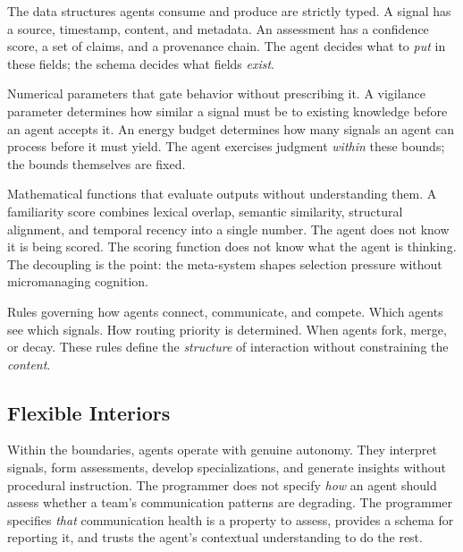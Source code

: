 \documentclass[11pt,twocolumn]{article}
\begin{document}
\begin{description}[nosep,leftmargin=1em]
  \item[Schemas.] The data structures agents consume and produce are
    strictly typed.  A signal has a source, timestamp, content, and
    metadata.  An assessment has a confidence score, a set of claims, and
    a provenance chain.  The agent decides what to \emph{put} in these
    fields; the schema decides what fields \emph{exist}.
  \item[Thresholds.] Numerical parameters that gate behavior without
    prescribing it.  A vigilance parameter determines how similar a
    signal must be to existing knowledge before an agent accepts it.  An
    energy budget determines how many signals an agent can process before
    it must yield.  The agent exercises judgment \emph{within} these
    bounds; the bounds themselves are fixed.
  \item[Scoring functions.] Mathematical functions that evaluate outputs
    without understanding them.  A familiarity score combines lexical
    overlap, semantic similarity, structural alignment, and temporal
    recency into a single number.  The agent does not know it is being
    scored.  The scoring function does not know what the agent is
    thinking.  The decoupling is the point: the meta-system shapes
    selection pressure without micromanaging cognition.
  \item[Topological rules.] Rules governing how agents connect,
    communicate, and compete.  Which agents see which signals.  How
    routing priority is determined.  When agents fork, merge, or decay.
    These rules define the \emph{structure} of interaction without
    constraining the \emph{content}.
\end{description}

\subsection{Flexible Interiors}

Within the boundaries, agents operate with genuine autonomy.  They
interpret signals, form assessments, develop specializations, and
generate insights without procedural instruction.  The programmer does
not specify \emph{how} an agent should assess whether a team's
communication patterns are degrading.  The programmer specifies
\emph{that} communication health is a property to assess, provides a
schema for reporting it, and trusts the agent's contextual
understanding to do the rest.
\end{document}
